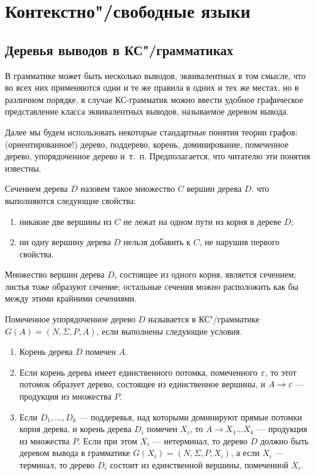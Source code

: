 \chapter{Контекстно"/свободные языки}
\label{cfg-intro}

\section{Деревья выводов в КС"/грамматиках}
\label{Chapter6-trees}

В грамматике может быть несколько выводов, эквивалентных в том смысле, что во всех них применяются одни и те же правила в одних и тех же местах, но в различном порядке, в случае КС-грамматик можно ввести удобное графическое представление класса эквивалентных выводов, называемое деревом вывода.

Далее мы будем использовать некоторые стандартные понятия теории графов: (ориентированное!) дерево, поддерево, корень, доминирование, помеченное дерево, упорядоченное дерево и~т.~п. Предполагается, что читателю эти понятия известны.

Сечением дерева $D$ назовем такое множество $C$ вершин дерева $D$. что выполняются следующие свойства: 
\begin{enumerate}
\item никакие две вершины из $C$ не лежат на одном пути из корня в дереве $D$; 
\item ни одну вершину дерева $D$ нельзя добавить к $C$, не нарушив первого свойства. 
\end{enumerate}

Множество вершин дерева $D$, состоящее из одного корня, является сечением; листья тоже образуют сечение; остальные сечения можно расположить как бы между этими крайними сечениями.

Помеченное упорядоченное дерево $D$ называется
 в КС"/грамматике $G(A)=(N,\Sigma,P,A)$,
если выполнены следующие условия.
\begin{enumerate}

\item Корень дерева $D$ помечен $A$.

\item Если корень дерева имеет единственного потомка, помеченного $\varepsilon$, то этот потомок образует дерево, состоящее из единственное вершины, и $A\to\varepsilon$ --- продукция из множества $P$.

\item Если $D_1, \ldots ,D_k$ --- поддеревья, над которыми доминируют прямые потомки корня дерева, и корень дерева $D_i$ помечен $X_i$, то $A\to X_1 \ldots X_k$ --- продукция из множества $P$. Если при этом $X_i$ --- нетерминал, то дерево $D$ должно быть деревом вывода в грамматике $G(X_i)=(N,\Sigma,P,X_i)$, а если $X_i$ --- терминал, то дерево $D_i$ состоит из единственной вершины, помеченной $X_i$.
\end{enumerate}

